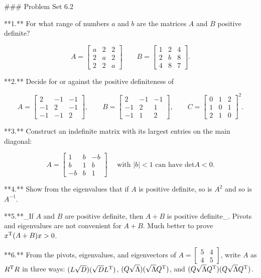 

### Problem Set 6.2

**1.** For what range of numbers \(a\) and \(b\) are the matrices \(A\) and \(B\) positive definite?

\[A=\begin{bmatrix}a&2&2\\ 2&a&2\\ 2&2&a\end{bmatrix}\qquad B=\begin{bmatrix}1&2&4\\ 2&b&8\\ 4&8&7\end{bmatrix}.\]

**2.** Decide for or against the positive definiteness of

\[A=\begin{bmatrix}2&-1&-1\\ -1&2&-1\\ -1&-1&2\end{bmatrix},\qquad B=\begin{bmatrix}2&-1&-1\\ -1&2&1\\ -1&1&2\end{bmatrix},\qquad C=\begin{bmatrix}0&1&2\\ 1&0&1\\ 2&1&0\end{bmatrix}^{2}.\]

**3.** Construct an indefinite matrix with its largest entries on the main diagonal:

\[A=\begin{bmatrix}1&b&-b\\ b&1&b\\ -b&b&1\end{bmatrix}\quad\text{ with }|b|<1\text{ can have }\text{det}A<0.\]

**4.** Show from the eigenvalues that if \(A\) is positive definite, so is \(A^{2}\) and so is \(A^{-1}\).

**5.**_If \(A\) and \(B\) are positive definite, then \(A+B\) is positive definite_. Pivots and eigenvalues are not convenient for \(A+B\). Much better to prove \(x^{\rm T}(A+B)x>0\).

**6.** From the pivots, eigenvalues, and eigenvectors of \(A=\begin{bmatrix}5&4\\ 4&5\end{bmatrix}\), write \(A\) as \(R^{\rm T}R\) in three ways: \((L\sqrt{D})(\sqrt{D}L^{\rm T})\), \((Q\sqrt{\Lambda})(\sqrt{\Lambda}Q^{\rm T})\), and \((Q\sqrt{\Lambda}Q^{\rm T})(Q\sqrt{\Lambda}Q^{\rm T})\).

